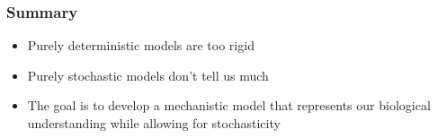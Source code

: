 \documentclass[color=usenames,dvipsnames]{beamer}\usepackage[]{graphicx}\usepackage[]{color}
\begin{document}
\begin{frame}
  \frametitle{Summary}
  \Large
  \begin{itemize}[<+->]
    \item Purely deterministic models are too rigid
    \item Purely stochastic models don't tell us much
    \item The goal is to develop a mechanistic model that represents
      our biological understanding while allowing for stochasticity
  \end{itemize}
\end{frame}














\end{document}
